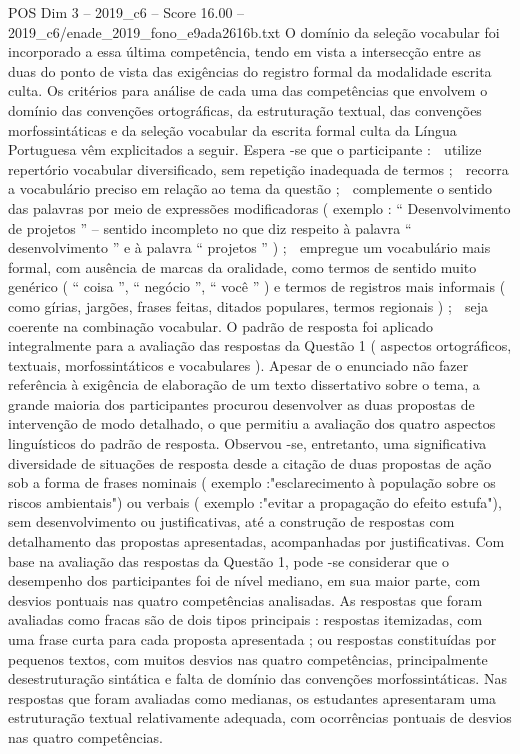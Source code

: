 \begin{textsample}{POS Dim 3 – 2019\_c6 – Score 16.00 – 2019\_c6/enade\_2019\_fono\_e9ada2616b.txt}
O domínio da seleção vocabular foi incorporado a essa última competência, tendo em vista a intersecção entre as duas do ponto de vista das exigências do registro formal da modalidade escrita culta.
Os critérios para análise de cada uma das competências que envolvem o domínio das convenções ortográficas, da estruturação textual, das convenções morfossintáticas e da seleção vocabular da escrita formal culta da Língua Portuguesa vêm explicitados a seguir.
Espera -se que o participante :  utilize repertório vocabular diversificado, sem repetição inadequada de termos ;  recorra a vocabulário preciso em relação ao tema da questão ;  complemente o sentido das palavras por meio de expressões modificadoras ( exemplo : “ Desenvolvimento de projetos ” – sentido incompleto no que diz respeito à palavra “ desenvolvimento ” e à palavra “ projetos ” ) ;  empregue um vocabulário mais formal, com ausência de marcas da oralidade, como termos de sentido muito genérico ( “ coisa ”, “ negócio ”, “ você ” ) e termos de registros mais informais ( como gírias, jargões, frases feitas, ditados populares, termos regionais ) ;  seja coerente na combinação vocabular.
O padrão de resposta foi aplicado integralmente para a avaliação das respostas da Questão 1 ( aspectos ortográficos, textuais, morfossintáticos e vocabulares ).
Apesar de o enunciado não fazer referência à exigência de elaboração de um texto dissertativo sobre o tema, a grande maioria dos participantes procurou desenvolver as duas propostas de intervenção de modo detalhado, o que permitiu a avaliação dos quatro aspectos linguísticos do padrão de resposta.
Observou -se, entretanto, uma significativa diversidade de situações de resposta desde a citação de duas propostas de ação sob a forma de frases nominais ( exemplo :"esclarecimento à população sobre os riscos ambientais") ou verbais ( exemplo :"evitar a propagação do efeito estufa"), sem desenvolvimento ou justificativas, até a construção de respostas com detalhamento das propostas apresentadas, acompanhadas por justificativas.
Com base na avaliação das respostas da Questão 1, pode -se considerar que o desempenho dos participantes foi de nível mediano, em sua maior parte, com desvios pontuais nas quatro competências analisadas.
As respostas que foram avaliadas como fracas são de dois tipos principais : respostas itemizadas, com uma frase curta para cada proposta apresentada ; ou respostas constituídas por pequenos textos, com muitos desvios nas quatro competências, principalmente desestruturação sintática e falta de domínio das convenções morfossintáticas.
Nas respostas que foram avaliadas como medianas, os estudantes apresentaram uma estruturação textual relativamente adequada, com ocorrências pontuais de desvios nas quatro competências.

\end{textsample}

